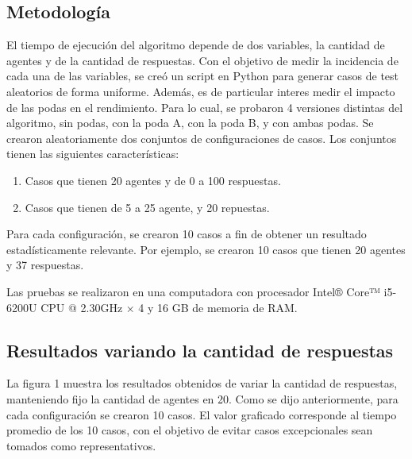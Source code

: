 \documentclass{article}
\begin{document}
\subsection{Metodología}

El tiempo de ejecución del algoritmo depende de dos variables, la cantidad de agentes y de la cantidad de respuestas. 
Con el objetivo de medir la incidencia de cada una de las variables, se creó un script en Python para generar casos de test aleatorios de forma uniforme. 
Además, es de particular interes medir el impacto de las podas en el rendimiento. Para lo cual, se probaron 4 versiones distintas del algoritmo, sin podas, con la poda A, con la poda B, y con ambas podas.
Se crearon aleatoriamente dos conjuntos de configuraciones de casos. Los conjuntos tienen las siguientes características:

\begin{enumerate}
	\item Casos que tienen 20 agentes y de 0 a 100 respuestas.
	\item Casos que tienen de 5 a 25 agente, y 20 repuestas.
\end{enumerate}

Para cada configuración, se crearon 10 casos a fin de obtener un resultado estadísticamente relevante. Por ejemplo, se crearon 10 casos que tienen 20 agentes y 37 respuestas.

Las pruebas se realizaron en una computadora con procesador Intel® Core™ i5-6200U CPU @ 2.30GHz × 4 y 16 GB de memoria de RAM.

\subsection{Resultados variando la cantidad de respuestas}

La figura 1 muestra los resultados obtenidos de variar la cantidad de respuestas, manteniendo fijo la cantidad de agentes en 20. Como se dijo anteriormente, para cada configuración se crearon 10 casos. El valor graficado corresponde al tiempo promedio de los 10 casos, con el objetivo de evitar casos excepcionales sean tomados como representativos.

 
\end{document}
